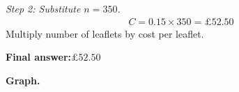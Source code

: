 \documentclass[11pt]{article}
\begin{document}
\textit{Step 2: Substitute \( n = 350 \).}
\[\begin{gathered}
C = 0.15 \times 350 = \pounds 52.50
\end{gathered}\]
Multiply number of leaflets by cost per leaflet.

\begin{answerbox}
\textbf{Final answer:}\quad \(\displaystyle  \pounds 52.50 \)
\end{answerbox}
\textbf{Graph.}

\begin{center}
\end{center}
\end{document}
